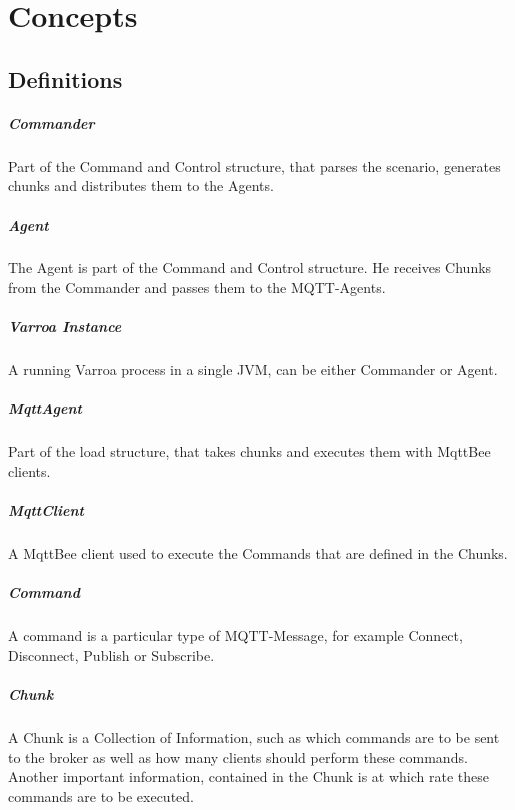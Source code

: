 \chapter{Concepts}

\section{Definitions}

\paragraph{Commander}
Part of the Command and Control structure, that parses the scenario, generates chunks and distributes them to the Agents.

\paragraph{Agent}
The Agent is part of the Command and Control structure.
He receives Chunks from the Commander and passes them to the MQTT-Agents.

\paragraph{Varroa Instance}
A running Varroa process in a single JVM, can be either Commander or Agent.

\paragraph{MqttAgent}
Part of the load structure, that takes chunks and executes them with MqttBee clients.

\paragraph{MqttClient}
A MqttBee client used to execute the Commands that are defined in the Chunks.

\paragraph{Command}
A command is a particular type of MQTT-Message, for example Connect, Disconnect, Publish or Subscribe.

\paragraph{Chunk}
A Chunk is a Collection of Information, such as which commands are to be sent to the broker as well as how many clients should perform these commands.
Another important information, contained in the Chunk is at which rate these commands are to be executed.

